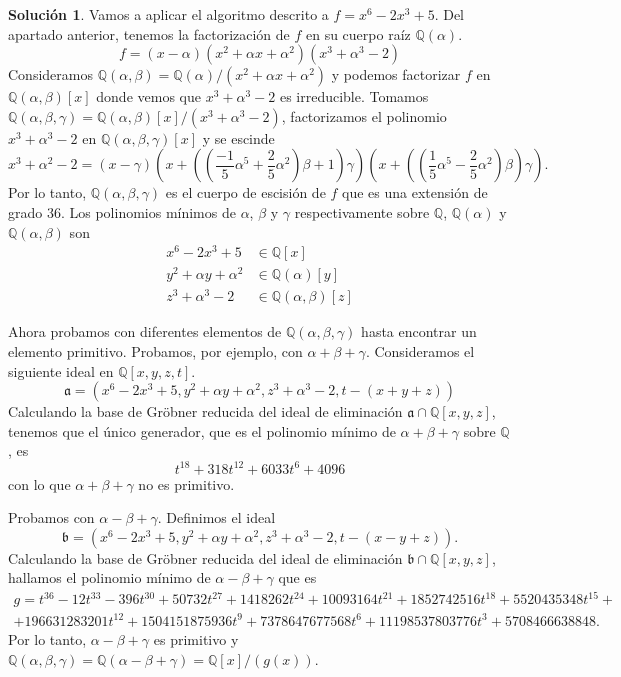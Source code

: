 \documentclass[10pt]{article}
\theoremstyle{definition}
\newtheorem*{sol}{Solución}
\newcommand{\QQ}{\mathbb{Q}}
\begin{document}
\begin{sol}
Vamos a aplicar el algoritmo descrito a $f=x^6-2x^3+5$. Del apartado anterior, tenemos la factorización de $f$ en su cuerpo raíz $\QQ(\alpha)$.
\[f = (x-\alpha)(x^2+\alpha x+\alpha^2)(x^3+\alpha^3-2)\]
Consideramos $\QQ(\alpha,\beta) = \QQ(\alpha)/(x^2+\alpha x+\alpha^2)$  y podemos factorizar $f$ en $\QQ(\alpha,\beta)[x]$ donde vemos que $x^3+\alpha^3-2$ es irreducible. Tomamos $\QQ(\alpha,\beta,\gamma)=\QQ(\alpha,\beta)[x]/(x^3+\alpha^3-2)$, factorizamos el polinomio $x^3+\alpha^3-2$ en $\QQ(\alpha,\beta,\gamma)[x]$ y se escinde
\[x^3+\alpha^2-2 = \left(x - \gamma\right)\left(x + \left(\left(\frac{-1}{5}\alpha^5 + \frac{2}{5}\alpha^2\right)\beta + 1\right)\gamma\right)\left(x + \left(\left(\frac{1}{5}\alpha^5 - \frac{2}{5}\alpha^2\right)\beta\right)\gamma\right).\]
Por lo tanto, $\QQ(\alpha,\beta,\gamma)$ es el cuerpo de escisión de $f$ que es una extensión de grado $36$. Los polinomios mínimos de $\alpha$, $\beta$ y $\gamma$ respectivamente sobre $\QQ$, $\QQ(\alpha)$ y $\QQ(\alpha,\beta)$ son
\begin{align*}x^6-2x^3+5 &\in\QQ[x]\\
y^2+\alpha y+\alpha^2 & \in\QQ(\alpha)[y]\\
z^3+\alpha^3-2 & \in\QQ(\alpha,\beta)[z]\end{align*}

Ahora probamos con diferentes elementos de $\QQ(\alpha,\beta,\gamma)$ hasta encontrar un elemento primitivo. Probamos, por ejemplo, con $\alpha+\beta+\gamma$. Consideramos el siguiente ideal en $\QQ[x,y,z,t]$.
\[\mathfrak{a} = \left(x^6-2x^3+5, y^2+\alpha y+\alpha^2, z^3+\alpha^3-2, t-(x+y+z)\right)\]
Calculando la base de Gröbner reducida del ideal de eliminación $\mathfrak{a}\cap\QQ[x,y,z]$, tenemos que el único generador, que es el polinomio mínimo de $\alpha+\beta+\gamma$ sobre $\QQ$, es
\[t^{18} + 318t^{12} + 6033t^6 + 4096\]
con lo que $\alpha+\beta+\gamma$ no es primitivo.

Probamos con $\alpha-\beta+\gamma$. Definimos el ideal 
\[\mathfrak{b} = \left(x^6-2x^3+5, y^2+\alpha y+\alpha^2, z^3+\alpha^3-2, t-(x-y+z)\right).\]
Calculando la base de Gröbner reducida del ideal de eliminación $\mathfrak{b}\cap\QQ[x,y,z]$, hallamos el polinomio mínimo de $\alpha-\beta+\gamma$ que es
\begin{multline*}
g=t^{36} - 12 t^{33} - 396 t^{30} + 50732 t^{27} + 1418262 t^{24} + 10093164 t^{21} + 1852742516 t^{18} + 5520435348 t^{15}+\\ + 196631283201 t^{12} + 1504151875936 t^{9} + 7378647677568 t^{6} + 11198537803776 t^{3} + 5708466638848.  
\end{multline*}
Por lo tanto, $\alpha-\beta+\gamma$ es primitivo y $\QQ(\alpha,\beta,\gamma)=\QQ(\alpha-\beta+\gamma)=\QQ[x]/(g(x))$.


\end{sol}
\end{document}
